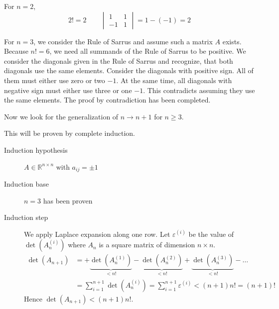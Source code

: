 \documentclass[a4paper]{article}
\theoremstyle{definition}
\begin{document}
For $n=2$,
\[ 2! = 2 \qquad \begin{vmatrix} 1 & 1 \\ -1 & 1 \end{vmatrix} = 1 - (-1) = 2 \]

For $n=3$, we consider the Rule of Sarrus and assume such a matrix $A$ exists.
Because $n! = 6$, we need all summands of the Rule of Sarrus to be positive. We consider the diagonals given in the Rule of Sarrus and recognize, that both diagonals use the same elements. 
Consider the diagonals with positive sign. All of them must either use zero or two $-1$. At the same time, all diagonals with negative sign must either use three or one $-1$. This contradicts assuming they use the same elements. The proof by contradiction has been completed.

Now we look for the generalization of $n \to n+1$ for $n \geq 3$.

This will be proven by complete induction.
\begin{description}
  \item[Induction hypothesis] $A \in \mathbb R^{n \times n}$ with $a_{ij} = \pm 1$
  \item[Induction base] $n=3$ has been proven
  \item[Induction step] We apply Laplace expansion along one row.
    Let $\varepsilon^{(i)}$ be the value of $\det(A_n^{(i)})$ where $A_n$ is a square matrix of dimension $n \times n$.
    \begin{align*}
      \det(A_{n+1}) &= +\underbrace{\det(A_n^{(1)})}_{< n!} - \underbrace{\det(A_n^{(2)})}_{< n!} + \underbrace{\det(A_n^{(3)})}_{< n!} - \ldots \\
        &= \sum_{i=1}^{n+1} \det(A_n^{(i)}) = \sum_{i=1}^{n+1} \varepsilon^{(i)} < (n+1) n! = (n+1)!
    \end{align*}
    Hence $\det(A_{n+1}) < (n+1) n!$.
\end{description}
\end{document}
